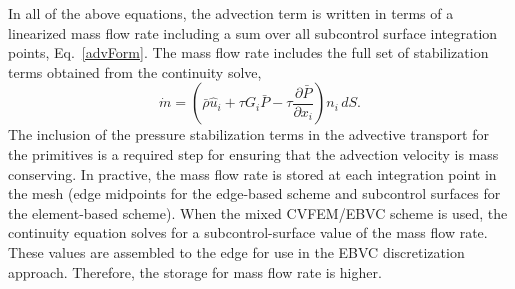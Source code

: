 In all of the above equations, the advection term is written in terms of a linearized 
mass flow rate including a sum over all subcontrol surface integration points,
Eq.~\ref{advForm}. The mass flow rate includes the full set of stabilization terms
obtained from the continuity solve,
\begin{equation}
\dot m = \left(\bar{\rho} \hat{u}_i + \tau G_i \bar{P} 
  -\tau \frac{\partial \bar{P}}{\partial x_i}\right) n_i\, dS.
\end{equation}
The inclusion of the pressure stabilization terms in the advective
transport for the primitives is a required step for ensuring that
the advection velocity is mass conserving. In practive, the mass flow
rate is stored at each integration point in the mesh (edge midpoints for the
edge-based scheme and subcontrol surfaces for the element-based scheme).
When the mixed CVFEM/EBVC scheme is used, the continuity equation solves for
a subcontrol-surface value of the mass flow rate. These values are assembled to the
edge for use in the EBVC discretization approach. Therefore, the storage for mass
flow rate is higher.

